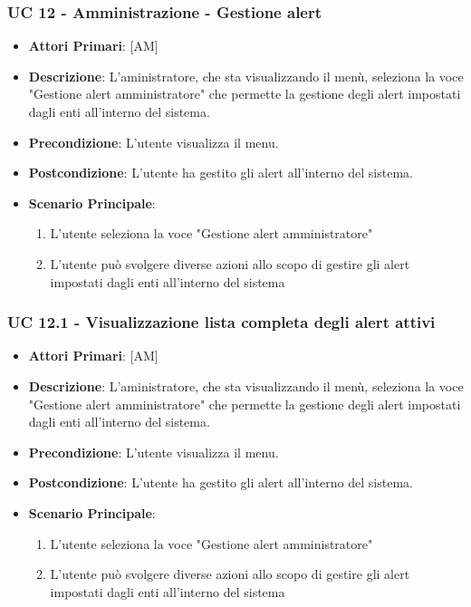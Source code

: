 \subsubsection{UC 12 - Amministrazione - Gestione alert}
		\begin{itemize}
			\item \textbf{Attori Primari}: [AM]
			\item \textbf{Descrizione}: L'aministratore, che sta visualizzando il menù, seleziona la voce "Gestione alert amministratore" che permette la gestione degli alert impostati dagli enti all'interno del sistema.
			\item \textbf{Precondizione}: L'utente visualizza il menu.
			\item \textbf{Postcondizione}: L'utente ha gestito gli alert all'interno del sistema.
			\item \textbf{Scenario Principale}:
			\begin{enumerate}
				\item{L'utente seleziona la voce "Gestione alert amministratore"}
				\item{L'utente può svolgere diverse azioni allo scopo di gestire gli alert impostati dagli enti all'interno del sistema}
			\end{enumerate}	
		\end{itemize}

		\subsubsection{UC 12.1 - Visualizzazione lista completa degli alert attivi}
		\begin{itemize}
			\item \textbf{Attori Primari}: [AM]
			\item \textbf{Descrizione}: L'aministratore, che sta visualizzando il menù, seleziona la voce "Gestione alert amministratore" che permette la gestione degli alert impostati dagli enti all'interno del sistema.
			\item \textbf{Precondizione}: L'utente visualizza il menu.
			\item \textbf{Postcondizione}: L'utente ha gestito gli alert all'interno del sistema.
			\item \textbf{Scenario Principale}:
			\begin{enumerate}
				\item{L'utente seleziona la voce "Gestione alert amministratore"}
				\item{L'utente può svolgere diverse azioni allo scopo di gestire gli alert impostati dagli enti all'interno del sistema}
			\end{enumerate}	
		\end{itemize}

